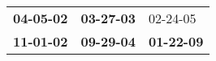 \begin{supertabular}{p{0.33\columnwidth}p{0.33\columnwidth}p{0.33\columnwidth}}
 \textbf{04-05-02\textsuperscript{}} &  \textbf{03-27-03\textsuperscript{}} &           02-24-05\textsuperscript{} \\
 \textbf{11-01-02\textsuperscript{}} &  \textbf{09-29-04\textsuperscript{}} &  \textbf{01-22-09\textsuperscript{}} \\
\end{supertabular}
